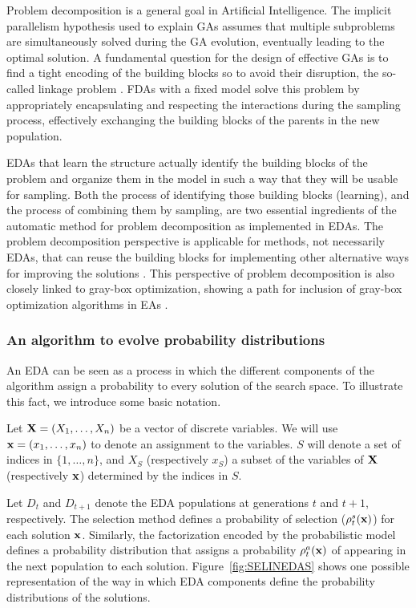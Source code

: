 \documentclass{article} %
\begin{document}
 Problem decomposition is a general goal in Artificial Intelligence. The implicit parallelism hypothesis used to explain GAs assumes that multiple subproblems are simultaneously solved during the GA evolution, eventually leading to the optimal solution. A fundamental question for the design of effective GAs is to find a tight encoding of the building blocks so to avoid their disruption, the so-called linkage problem \cite{Harik_and_Goldberg:1996,Holland:1975}. FDAs with a fixed model solve this problem by appropriately encapsulating and respecting the interactions during the sampling process, effectively exchanging the building blocks of the parents in the new population.


 EDAs that learn the structure actually identify the building blocks of the problem and organize them in the model  in such a way that they will be usable for sampling. Both the process of identifying those building blocks (learning), and the process of combining them by sampling, are two essential ingredients of the automatic method for problem decomposition as implemented in EDAs. The problem decomposition perspective is applicable for methods, not necessarily EDAs, that can reuse the building blocks for implementing other alternative ways for improving the solutions \cite{Mendiburu_et_al:2012,Santana_et_al:2013b,Sastry_and_Goldberg:2004a}. This perspective of problem decomposition is also closely linked to gray-box optimization, showing a path for inclusion of gray-box optimization algorithms in EAs \cite{Goldman_et_al:2015}. 

\subsubsection{An algorithm to evolve probability distributions}

An EDA can be seen as a process in which the different components of the algorithm assign a probability to every solution of the search space. To illustrate this fact, we introduce some basic notation.

Let $ {\bf{X}}=(X_1,\ldots ,X_n)$ be a vector of discrete variables. We will  use ${\bf{x}}=(x_1,\ldots ,x_n)$ to denote an assignment to the variables. $S$ will denote a set of indices in $\{1, \ldots, n\}$, and $X_S$ (respectively $x_S$) a subset of the variables of ${\bf{X}}$ (respectively ${\bf{x}}$) determined by the indices in $S$.

Let  $D_{t}$ and $D_{t+1}$ denote the EDA populations at generations $t$ and $t+1$, respectively. The selection method defines a probability of selection ($\rho_{t}^s({\bf{x}})$) for each solution ${\bf{x}}$. Similarly, the factorization encoded by the probabilistic model defines a probability distribution that assigns a probability $\rho_{t}^a({\bf{x}})$ of appearing in the next population to each solution. Figure~\ref{fig:SELINEDAS} shows one possible representation of the way in which EDA components define the probability distributions of the solutions. 
\end{document}
